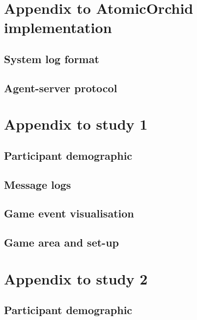 \chapter{Appendix to AtomicOrchid implementation}

\section{System log format}

\section{Agent-server protocol}

\chapter{Appendix to study 1}

\section{Participant demographic}

\section{Message logs}

\section{Game event visualisation}

\section{Game area and set-up}

\chapter{Appendix to study 2}

\section{Participant demographic}

